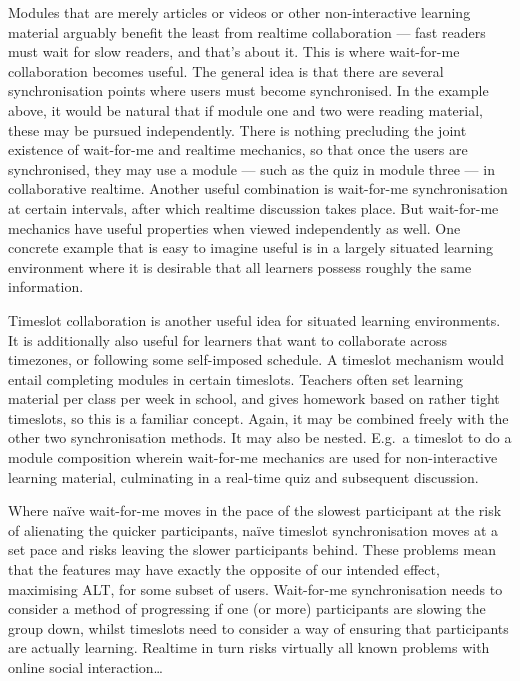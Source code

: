 \documentclass{article}
\begin{document}
\begin{multicols}{2}
Modules that are merely articles or videos or other non-interactive learning 
material arguably benefit the least from realtime collaboration --- fast 
readers must wait for slow readers, and that's about it. This is where 
wait-for-me collaboration becomes useful. The general idea is that there are 
several synchronisation points where users must become synchronised. In the 
example above, it would be natural that if module one and two were reading 
material, these may be pursued independently. There is nothing precluding the 
joint existence of wait-for-me and realtime mechanics, so that once the users 
are synchronised, they may use a module --- such as the quiz in module three 
--- in collaborative realtime. Another useful combination is wait-for-me 
synchronisation at certain intervals, after which realtime discussion takes 
place. But wait-for-me mechanics have useful properties when viewed 
independently as well. One concrete example that is easy to imagine useful is 
in a largely situated learning environment where it is desirable that all 
learners possess roughly the same information.

Timeslot collaboration is another useful idea for situated learning 
environments. It is additionally also useful for learners that want to 
collaborate across timezones, or following some self-imposed schedule. A 
timeslot mechanism would entail completing modules in certain timeslots. 
Teachers often set learning material per class per week in school, and gives 
homework based on rather tight timeslots, so this is a familiar concept. 
Again, it may be combined freely with the other two synchronisation methods. 
It may also be nested. E.g.\ a timeslot to do a module composition wherein 
wait-for-me mechanics are used for non-interactive learning material, 
culminating in a real-time quiz and subsequent discussion.

Where naïve wait-for-me moves in the pace of the slowest participant at the 
risk of alienating the quicker participants, naïve timeslot synchronisation 
moves at a set pace and risks leaving the slower participants behind. These 
problems mean that the features may have exactly the opposite of our intended 
effect, maximising ALT, for some subset of users. Wait-for-me synchronisation 
needs to consider a method of progressing if one (or more) participants are 
slowing the group down, whilst timeslots need to consider a way of ensuring 
that participants are actually learning. Realtime in turn risks virtually all 
known problems with online social interaction\ldots


\end{multicols}
\end{document}
